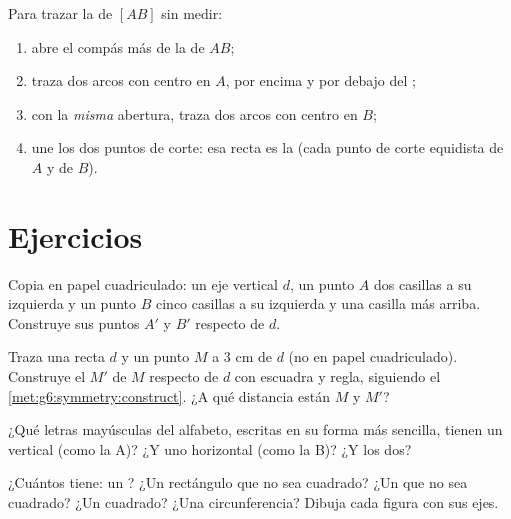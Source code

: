 \begin{method}\label{met:g6:symmetry:bisector}
Para trazar la  de $[AB]$ sin medir:
\begin{enumerate}
  \item abre el compás más de la  de $AB$;
  \item traza dos arcos con centro en $A$, por encima y por debajo del ;
  \item con la \emph{misma} abertura, traza dos arcos con centro en $B$;
  \item une los dos puntos de corte: esa recta es la 
        (cada punto de corte equidista de $A$ y de $B$).
\end{enumerate}
\end{method}

\section{Ejercicios}

\begin{exercise}[$\star$]\label{exo:g6:symmetry:1}
Copia en papel cuadriculado: un eje vertical $d$, un punto $A$ dos casillas a su
izquierda y un punto $B$ cinco casillas a su izquierda y una casilla más arriba.
Construye sus puntos  $A'$ y $B'$ respecto de $d$.
\end{exercise}

\begin{exercise}[$\star$]\label{exo:g6:symmetry:2}
Traza una recta $d$ y un punto $M$ a $3$ cm de $d$ (no en papel
cuadriculado). Construye el  $M'$ de $M$ respecto de $d$ con escuadra
y regla, siguiendo el \cref{met:g6:symmetry:construct}. ¿A qué distancia
están $M$ y $M'$?
\end{exercise}

\begin{exercise}[$\star$]\label{exo:g6:symmetry:3}
¿Qué letras mayúsculas del alfabeto, escritas en su forma más sencilla,
tienen un  vertical (como la A)? ¿Y uno horizontal (como la B)?
¿Y los dos?
\end{exercise}

\begin{exercise}[$\star$]\label{exo:g6:symmetry:4}
¿Cuántos  tiene: un ? ¿Un rectángulo
que no sea cuadrado? ¿Un  que no sea cuadrado? ¿Un cuadrado? ¿Una circunferencia?
Dibuja cada figura con sus ejes.
\end{exercise}

